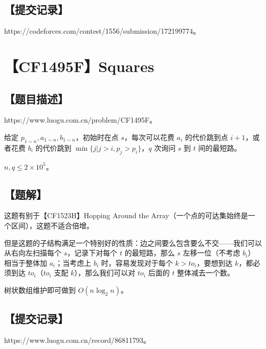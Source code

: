 \documentclass[UTF8,12pt,a4paper]{ctexart}
\begin{document}
	\subsection*{【提交记录】}
	
	https://codeforces.com/contest/1556/submission/172199774。
	
	
	\section*{【CF1495F】Squares}
	
	\subsection*{【题目描述】}
	
	https://www.luogu.com.cn/problem/CF1495F。
	
	给定 $p_{1\sim n},a_{1\sim n},b_{1\sim n}$，初始时在点 $s$，每次可以花费 $a_i$ 的代价跳到点 $i+1$，或者花费 $b_i$ 的代价跳到 $\min\{j|j>i,p_j>p_i\}$，$q$ 次询问 $s$ 到 $t$ 间的最短路。
	
	$n,q\le 2\times 10^5$。
	
	\subsection*{【题解】}
	
	这题有别于【CF1523H】Hopping Around the Array（一个点的可达集始终是一个区间），这题不适合倍增。
	
	但是这题的子结构满足一个特别好的性质：边之间要么包含要么不交——我们可以从右向左扫描每个 $s$，记录下对每个 $t$ 的最短路，那么 $s$ 左移一位（不考虑 $b_i$）相当于整体加 $a_i$；当考虑上 $b_i$ 时，容易发现对于每个 $k>to_i$，要想到达 $k$，都必须到达 $to_i$（$to_i$ 支配 $k$），那么我们可以对 $to_i$ 后面的 $t$ 整体减去一个数。
	
	树状数组维护即可做到 $O(n\log_2n)$。
	
	\subsection*{【提交记录】}
	
	https://www.luogu.com.cn/record/86811793。
	
	
\end{document}
